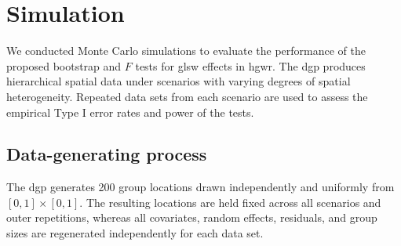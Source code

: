 \documentclass[times]{interact}
\theoremstyle{plain}%
\theoremstyle{definition}
\theoremstyle{remark}
\begin{document}


\section{Simulation}\label{sec:test-hgwr-simulation}

We conducted Monte Carlo simulations to evaluate the performance of the proposed bootstrap and $F$ tests for \gls{glsw} effects in \gls{hgwr}.
The \gls{dgp} produces hierarchical spatial data under scenarios with varying degrees of spatial heterogeneity.
Repeated data sets from each scenario are used to assess the empirical Type I error rates and power of the tests.

\subsection{Data-generating process}\label{sec:simulation-dgp}

The \gls{dgp} generates 200 group locations drawn independently and uniformly from $[0,1]\times [0,1]$.
The resulting locations are held fixed across all scenarios and outer repetitions, whereas all covariates, random effects, residuals, and group sizes are regenerated independently for each data set.
\end{document}
